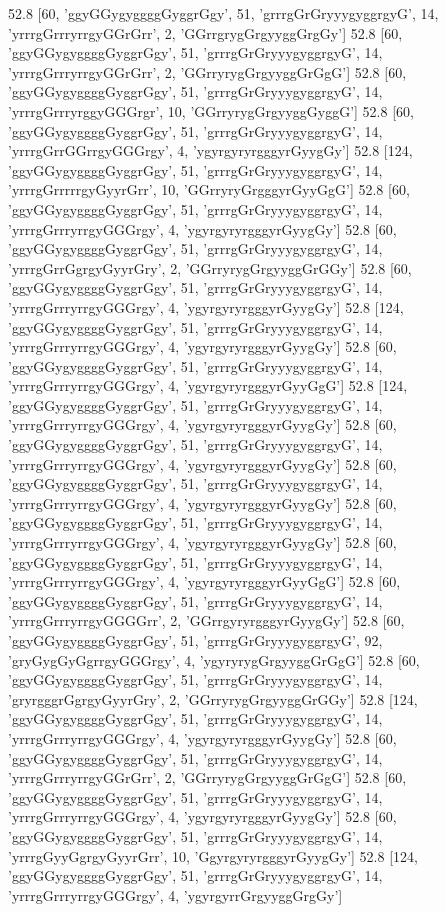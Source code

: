 52.8 [60, 'ggyGGygyggggGyggrGgy', 51, 'grrrgGrGryyygyggrgyG', 14, 'yrrrgGrrryrrgyGGrGrr', 2, 'GGrrgrygGrgyyggGrgGy']
52.8 [60, 'ggyGGygyggggGyggrGgy', 51, 'grrrgGrGryyygyggrgyG', 14, 'yrrrgGrrryrrgyGGrGrr', 2, 'GGrryrygGrgyyggGrGgG']
52.8 [60, 'ggyGGygyggggGyggrGgy', 51, 'grrrgGrGryyygyggrgyG', 14, 'yrrrgGrrryrggyGGGrgr', 10, 'GGrryrygGrgyyggGyggG']
52.8 [60, 'ggyGGygyggggGyggrGgy', 51, 'grrrgGrGryyygyggrgyG', 14, 'yrrrgGrrGGrrgyGGGrgy', 4, 'ygyrgyryrgggyrGyygGy']
52.8 [124, 'ggyGGygyggggGyggrGgy', 51, 'grrrgGrGryyygyggrgyG', 14, 'yrrrgGrrrrrgyGyyrGrr', 10, 'GGrryryGrgggyrGyyGgG']
52.8 [60, 'ggyGGygyggggGyggrGgy', 51, 'grrrgGrGryyygyggrgyG', 14, 'yrrrgGrrryrrgyGGGrgy', 4, 'ygyrgyryrgggyrGyygGy']
52.8 [60, 'ggyGGygyggggGyggrGgy', 51, 'grrrgGrGryyygyggrgyG', 14, 'yrrrgGrrGgrgyGyyrGry', 2, 'GGrryrygGrgyyggGrGGy']
52.8 [60, 'ggyGGygyggggGyggrGgy', 51, 'grrrgGrGryyygyggrgyG', 14, 'yrrrgGrrryrrgyGGGrgy', 4, 'ygyrgyryrgggyrGyygGy']
52.8 [124, 'ggyGGygyggggGyggrGgy', 51, 'grrrgGrGryyygyggrgyG', 14, 'yrrrgGrrryrrgyGGGrgy', 4, 'ygyrgyryrgggyrGyygGy']
52.8 [60, 'ggyGGygyggggGyggrGgy', 51, 'grrrgGrGryyygyggrgyG', 14, 'yrrrgGrrryrrgyGGGrgy', 4, 'ygyrgyryrgggyrGyyGgG']
52.8 [124, 'ggyGGygyggggGyggrGgy', 51, 'grrrgGrGryyygyggrgyG', 14, 'yrrrgGrrryrrgyGGGrgy', 4, 'ygyrgyryrgggyrGyygGy']
52.8 [60, 'ggyGGygyggggGyggrGgy', 51, 'grrrgGrGryyygyggrgyG', 14, 'yrrrgGrrryrrgyGGGrgy', 4, 'ygyrgyryrgggyrGyygGy']
52.8 [60, 'ggyGGygyggggGyggrGgy', 51, 'grrrgGrGryyygyggrgyG', 14, 'yrrrgGrrryrrgyGGGrgy', 4, 'ygyrgyryrgggyrGyygGy']
52.8 [60, 'ggyGGygyggggGyggrGgy', 51, 'grrrgGrGryyygyggrgyG', 14, 'yrrrgGrrryrrgyGGGrgy', 4, 'ygyrgyryrgggyrGyygGy']
52.8 [60, 'ggyGGygyggggGyggrGgy', 51, 'grrrgGrGryyygyggrgyG', 14, 'yrrrgGrrryrrgyGGGrgy', 4, 'ygyrgyryrgggyrGyyGgG']
52.8 [60, 'ggyGGygyggggGyggrGgy', 51, 'grrrgGrGryyygyggrgyG', 14, 'yrrrgGrrryrrgyGGGGrr', 2, 'GGrrgyryrgggyrGyygGy']
52.8 [60, 'ggyGGygyggggGyggrGgy', 51, 'grrrgGrGryyygyggrgyG', 92, 'gryGygGyGgrrgyGGGrgy', 4, 'ygyryrygGrgyyggGrGgG']
52.8 [60, 'ggyGGygyggggGyggrGgy', 51, 'grrrgGrGryyygyggrgyG', 14, 'gryrgggrGgrgyGyyrGry', 2, 'GGrryrygGrgyyggGrGGy']
52.8 [124, 'ggyGGygyggggGyggrGgy', 51, 'grrrgGrGryyygyggrgyG', 14, 'yrrrgGrrryrrgyGGGrgy', 4, 'ygyrgyryrgggyrGyygGy']
52.8 [60, 'ggyGGygyggggGyggrGgy', 51, 'grrrgGrGryyygyggrgyG', 14, 'yrrrgGrrryrrgyGGrGrr', 2, 'GGrryrygGrgyyggGrGgG']
52.8 [60, 'ggyGGygyggggGyggrGgy', 51, 'grrrgGrGryyygyggrgyG', 14, 'yrrrgGrrryrrgyGGGrgy', 4, 'ygyrgyryrgggyrGyygGy']
52.8 [60, 'ggyGGygyggggGyggrGgy', 51, 'grrrgGrGryyygyggrgyG', 14, 'yrrrgGyyGgrgyGyyrGrr', 10, 'GgyrgyryrgggyrGyygGy']
52.8 [124, 'ggyGGygyggggGyggrGgy', 51, 'grrrgGrGryyygyggrgyG', 14, 'yrrrgGrrryrrgyGGGrgy', 4, 'ygyrgyrrGrgyyggGrgGy']
